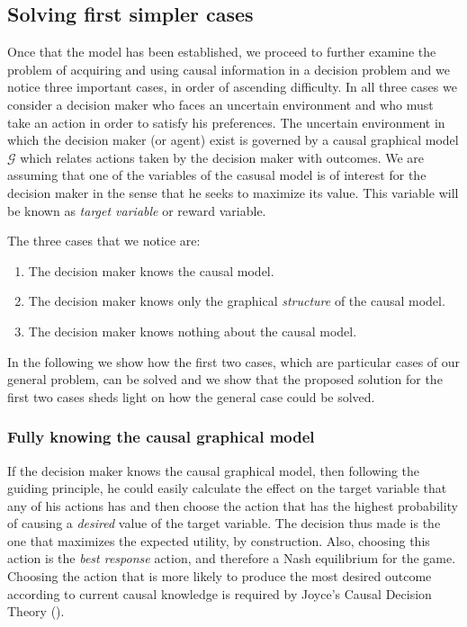 \documentclass[english,letterpaper,12pt,final]{article}
\theoremstyle{definition}
\begin{document}
\subsection{Solving first simpler cases}
Once that the model has been established, we proceed to further examine the problem of acquiring and using causal information in a decision problem and we notice three important cases, in order of ascending difficulty. In all three cases we consider a decision maker who faces an uncertain environment and who must take an action in order to satisfy his preferences. The uncertain environment in which the decision maker (or agent) exist is governed by a causal graphical model $\mathcal{G}$ which relates actions taken by the decision maker with outcomes. We are assuming that one of the variables of the casusal model is of interest for the decision maker in the sense that he seeks to maximize its value. This variable will be known as \textit{target variable} or reward variable.

The three cases that we notice are:
\begin{enumerate}
\item The decision maker knows the causal model.
\item The decision maker knows only the graphical \textit{structure} of the causal model.
\item The decision maker knows nothing about the causal model. 
\end{enumerate}
In the following we show how the first two cases, which are particular cases of our general problem, can be solved and we show that the proposed solution for the first two cases sheds light on how the general case could be solved.
\subsubsection{Fully knowing the causal graphical model}
If the decision maker knows the causal graphical model, then following the guiding principle, he could easily calculate the effect on the target variable that any of his actions has and then choose the action that has the highest probability of causing a \textit{desired} value of the target variable. The decision thus made is the one that maximizes the expected utility, by construction. Also, choosing this action is the \textit{best response} action, and therefore a Nash equilibrium for the game. Choosing the action that is more likely to produce the most desired outcome according to current causal knowledge is required by Joyce's Causal Decision Theory (\cite{joyce1999foundations}).
\end{document}
